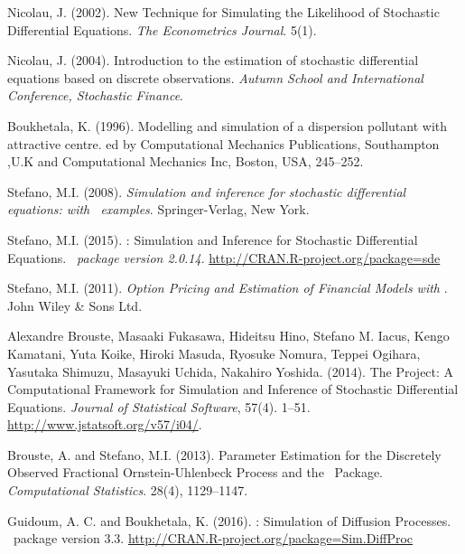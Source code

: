 \begin{thebibliography}{1}
Nicolau, J. (2002).
\newblock New Technique for Simulating the Likelihood of Stochastic Differential Equations.
\newblock \emph{The Econometrics Journal}. 5(1).

Nicolau, J. (2004).
\newblock  Introduction to the estimation of stochastic differential equations based on discrete observations.
\newblock  \emph{Autumn School and International Conference, Stochastic Finance}.

Boukhetala, K. (1996).
\newblock Modelling and simulation of a dispersion pollutant with attractive centre.
\newblock ed by Computational Mechanics Publications, Southampton ,U.K and Computational Mechanics Inc, Boston, USA, 245--252.

Stefano, M.I. (2008).
\newblock \emph{Simulation and inference for stochastic differential equations: with \R~examples}.
\newblock Springer-Verlag, New York.

Stefano, M.I. (2015).
\newblock {}: Simulation and Inference for Stochastic Differential Equations.
\newblock \emph{\R~package version 2.0.14}.
\newblock \url{http://CRAN.R-project.org/package=sde}

Stefano, M.I. (2011).
\newblock \emph{Option Pricing and Estimation of Financial Models with \R}.
\newblock John Wiley \& Sons Ltd.

Alexandre Brouste, Masaaki Fukasawa, Hideitsu Hino, Stefano M. Iacus, Kengo Kamatani, Yuta Koike, Hiroki Masuda, Ryosuke Nomura, Teppei Ogihara, Yasutaka Shimuzu, Masayuki Uchida, Nakahiro Yoshida. (2014).
\newblock The  Project: A Computational Framework for Simulation and Inference of Stochastic Differential Equations.
\newblock \emph{Journal of Statistical Software}, 57(4). 1--51.
\newblock \url{http://www.jstatsoft.org/v57/i04/}.

Brouste, A. and Stefano, M.I. (2013).
\newblock Parameter Estimation for the Discretely Observed Fractional Ornstein-Uhlenbeck Process and the  \R~Package.
\newblock \emph{Computational Statistics}. 28(4), 1129--1147.

Guidoum, A. C. and Boukhetala, K. (2016).
\newblock {}: Simulation of Diffusion Processes.
\newblock \R~package version 3.3.
\newblock \url{http://CRAN.R-project.org/package=Sim.DiffProc}


\end{thebibliography}
